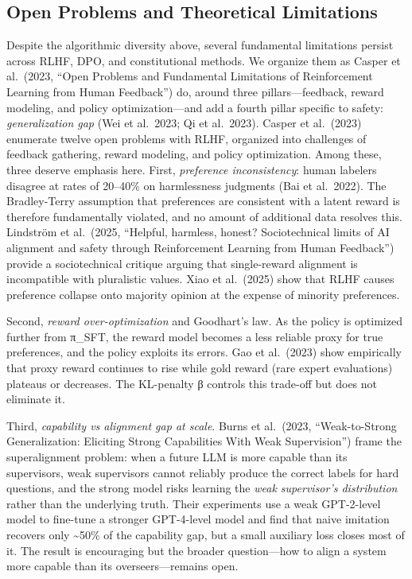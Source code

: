 \subsection{Open Problems and Theoretical Limitations}\label{open-problems-and-theoretical-limitations}

Despite the algorithmic diversity above, several fundamental limitations persist across RLHF, DPO, and constitutional methods. We organize them as Casper et al.~(2023, ``Open Problems and Fundamental Limitations of Reinforcement Learning from Human Feedback'') do, around three pillars---feedback, reward modeling, and policy optimization---and add a fourth pillar specific to safety: \emph{generalization gap} (Wei et al.~2023; Qi et al.~2023). Casper et al.~(2023) enumerate twelve open problems with RLHF, organized into challenges of feedback gathering, reward modeling, and policy optimization. Among these, three deserve emphasis here. First, \emph{preference inconsistency}: human labelers disagree at rates of 20--40\% on harmlessness judgments (Bai et al.~2022). The Bradley-Terry assumption that preferences are consistent with a latent reward is therefore fundamentally violated, and no amount of additional data resolves this. Lindström et al.~(2025, ``Helpful, harmless, honest? Sociotechnical limits of AI alignment and safety through Reinforcement Learning from Human Feedback'') provide a sociotechnical critique arguing that single-reward alignment is incompatible with pluralistic values. Xiao et al.~(2025) show that RLHF causes preference collapse onto majority opinion at the expense of minority preferences.

Second, \emph{reward over-optimization} and Goodhart's law. As the policy is optimized further from π\_SFT, the reward model becomes a less reliable proxy for true preferences, and the policy exploits its errors. Gao et al.~(2023) show empirically that proxy reward continues to rise while gold reward (rare expert evaluations) plateaus or decreases. The KL-penalty β controls this trade-off but does not eliminate it.

Third, \emph{capability vs alignment gap at scale}. Burns et al.~(2023, ``Weak-to-Strong Generalization: Eliciting Strong Capabilities With Weak Supervision'') frame the superalignment problem: when a future LLM is more capable than its supervisors, weak supervisors cannot reliably produce the correct labels for hard questions, and the strong model risks learning the \emph{weak supervisor's distribution} rather than the underlying truth. Their experiments use a weak GPT-2-level model to fine-tune a stronger GPT-4-level model and find that naive imitation recovers only \textasciitilde50\% of the capability gap, but a small auxiliary loss closes most of it. The result is encouraging but the broader question---how to align a system more capable than its overseers---remains open.

